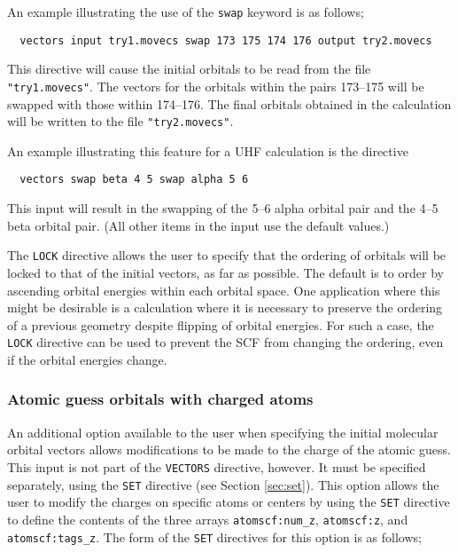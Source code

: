 An example illustrating the use of the \verb+swap+ keyword is as follows;
\begin{verbatim}
  vectors input try1.movecs swap 173 175 174 176 output try2.movecs
\end{verbatim}

This directive will cause the initial orbitals to be read 
from the file \verb+"try1.movecs"+.  The vectors for the orbitals
within the pairs 173--175 will be swapped with those within 174--176.
The final orbitals obtained in the calculation will be written to
the file \verb+"try2.movecs"+.

An example illustrating this feature for a UHF calculation is the directive

\begin{verbatim}
  vectors swap beta 4 5 swap alpha 5 6
\end{verbatim}

This input will result in the swapping of the 5--6 alpha orbital pair and 
the 4--5 beta orbital pair.  (All other items in the input use the
default values.)

The \verb+LOCK+ directive allows the user to specify that the ordering of 
orbitals will be locked to that of the
initial vectors, as far as possible. The default is to order by
ascending orbital energies within each orbital space. One application
where this might be desirable is a calculation where it is necessary 
to preserve the ordering of a previous geometry despite flipping of 
orbital energies.  For such a case, the \verb+LOCK+ directive can be used
to prevent the SCF from changing the ordering, even if the orbital
energies change.



\subsubsection{Atomic guess orbitals with charged atoms}

An additional option available to the user when specifying the initial
molecular orbital vectors allows modifications to be made to the charge
of the atomic guess.  This input is not part of the \verb+VECTORS+ directive,
however.  It must be specified separately, using the \verb+SET+
directive (see Section \ref{sec:set}).  This option allows the user to 
modify the charges on specific atoms or
centers by using the \verb+SET+ directive to define the contents
of the three arrays \verb+atomscf:num_z+, \verb+atomscf:z+, and
\verb+atomscf:tags_z+.  The form of the \verb+SET+ directives 
for this option is as follows;

